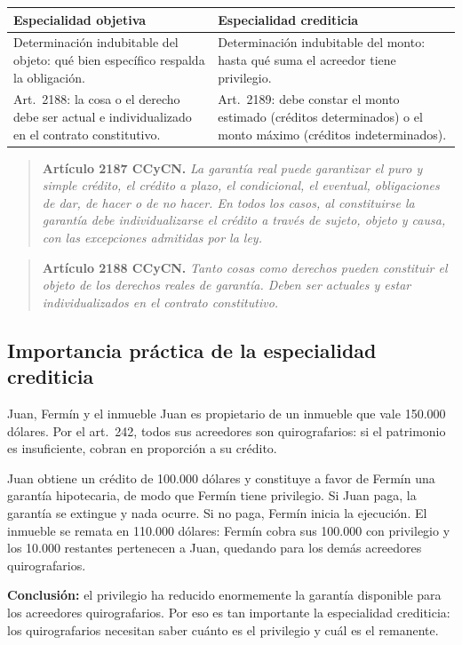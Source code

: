 \documentclass[12pt,oneside]{book}
\begin{document}
\begin{table}[H]
\centering
\begin{tabularx}{\textwidth}{@{}LL@{}}
\toprule
\textbf{Especialidad objetiva} & \textbf{Especialidad crediticia} \\
\midrule
Determinación indubitable del objeto: qué bien específico respalda la obligación. & Determinación indubitable del monto: hasta qué suma el acreedor tiene privilegio. \\
\addlinespace
Art.~2188: la cosa o el derecho debe ser actual e individualizado en el contrato constitutivo. & Art.~2189: debe constar el monto estimado (créditos determinados) o el monto máximo (créditos indeterminados). \\
\bottomrule
\end{tabularx}
\end{table}

\begin{quote}
\textbf{Artículo 2187 CCyCN.} \textit{La garantía real puede garantizar el puro y simple crédito, el crédito a plazo, el condicional, el eventual, obligaciones de dar, de hacer o de no hacer. En todos los casos, al constituirse la garantía debe individualizarse el crédito a través de sujeto, objeto y causa, con las excepciones admitidas por la ley.}
\end{quote}

\begin{quote}
\textbf{Artículo 2188 CCyCN.} \textit{Tanto cosas como derechos pueden constituir el objeto de los derechos reales de garantía. Deben ser actuales y estar individualizados en el contrato constitutivo.}
\end{quote}

\subsection{Importancia práctica de la especialidad crediticia}

\begin{ejemplo}{Juan, Fermín y el inmueble}
Juan es propietario de un inmueble que vale 150.000 dólares. Por el art.~242, todos sus acreedores son quirografarios: si el patrimonio es insuficiente, cobran en proporción a su crédito.

Juan obtiene un crédito de 100.000 dólares y constituye a favor de Fermín una garantía hipotecaria, de modo que Fermín tiene privilegio. Si Juan paga, la garantía se extingue y nada ocurre. Si no paga, Fermín inicia la ejecución. El inmueble se remata en 110.000 dólares: Fermín cobra sus 100.000 con privilegio y los 10.000 restantes pertenecen a Juan, quedando para los demás acreedores quirografarios.

\textbf{Conclusión:} el privilegio ha reducido enormemente la garantía disponible para los acreedores quirografarios. Por eso es tan importante la especialidad crediticia: los quirografarios necesitan saber cuánto es el privilegio y cuál es el remanente.
\end{ejemplo}
\end{document}
